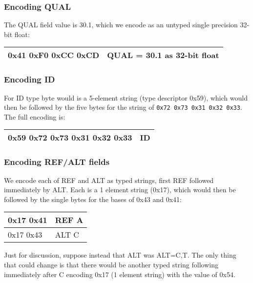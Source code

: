 \documentclass[8pt]{article}
\begin{document}
\subsubsection{Encoding QUAL}

The QUAL field value is 30.1, which we encode as an untyped single precision
32-bit float:

\vspace{0.3cm}
\begin{tabular}{|l| l|} \hline
0x41 0xF0 0xCC 0xCD & QUAL = 30.1 as 32-bit float \\ \hline
\end{tabular}

\subsubsection{Encoding ID}

For ID type byte would is a 5-element string (type descriptor 0x59),
which would then be followed by the five bytes for the string of
{\tt 0x72 0x73 0x31 0x32 0x33}.  The full encoding is:

\vspace{0.3cm}
\begin{tabular}{|l| l|} \hline
0x59 0x72 0x73 0x31 0x32 0x33 & ID \\ \hline
\end{tabular}

\subsubsection{Encoding REF/ALT fields}

We encode each of REF and ALT as typed strings, first REF followed immediately
by ALT.  Each is a 1 element string (0x17), which would then be followed by the
single bytes for the bases of 0x43 and 0x41:

\vspace{0.3cm}
\begin{tabular}{|l| l|} \hline
0x17 0x41 & REF A \\ \hline
0x17 0x43 & ALT C \\ \hline
\end{tabular}

\vspace{0.3cm}
Just for discussion, suppose instead that ALT was ALT=C,T.  The only thing that could change is that there would be another typed string following immediately after C encoding 0x17 (1 element string) with the value of 0x54.
\end{document}
